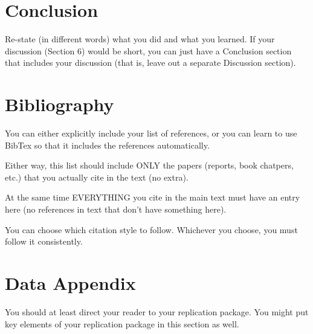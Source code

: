 \documentclass[12pt]{article}
\begin{document}
\section{Conclusion}
\label{sec:conclusion}

Re-state (in different words) what you did and what you learned. If your discussion (Section 6) would be short, you can just have a Conclusion section that includes your discussion (that is, leave out a separate Discussion section).

\newpage
\section*{Bibliography}
\singlespacing
\setlength\bibsep{0pt}

You can either explicitly include your list of references, or you can learn to use BibTex so that it includes the references automatically.

Either way, this list should include ONLY the papers (reports, book chatpers, etc.) that you actually cite in the text (no extra).

At the same time EVERYTHING you cite in the main text must have an entry here (no references in text that don't have something here).

You can choose which citation style to follow. Whichever you choose, you must follow it consistently.

\newpage
\section*{Data Appendix} \label{sec:appendixa}

You should at least direct your reader to your replication package. You might put key elements of your replication package in this section as well.
\end{document}
